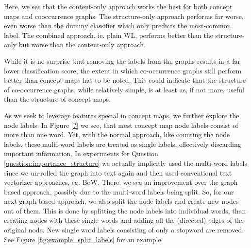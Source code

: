 Here, we see that the content-only approach works the best for both concept maps and cooccurrence graphs.
The structure-only approach performs far worse, even worse than the dummy classifier which only predicts the most-common label.
The combined approach, ie. plain WL, performs better than the structure-only but worse than the content-only approach.

While it is no surprise that removing the labels from the graphs results in a far lower classification score, the extent in which co-occurrence graphs still perform better than concept maps has to be noted.
This could indicate that the structure of co-occurrence graphs, while relatively simple, is at least as, if not more, useful than the structure of concept maps.


As we seek to leverage features special in concept maps, we further explore the node labels.
In Figure \ref{?} we see, that most concept map node labels consist of more than one word.
Yet, with the normal approach, like counting the node labels, these multi-word labels are treated as single labels, effectively discarding important information.
In experiments for Question \ref{question:importance_structure} we actually implicitly used the multi-word labels since we un-rolled the graph into text again and then used conventional text vectorizer approaches, eg. BoW.
There, we see an improvement over the graph based approach, possibly due to the multi-word labels being split.
So, for our next graph-based approach, we also split the node labels and create new nodes out of them.
This is done by splitting the node labels into individual words, than creating nodes with these single words and adding all the (directed) edges of the original node.
New single word labels consisting of only a stopword are removed.
See Figure \ref{fig:example_split_labels} for an example.

